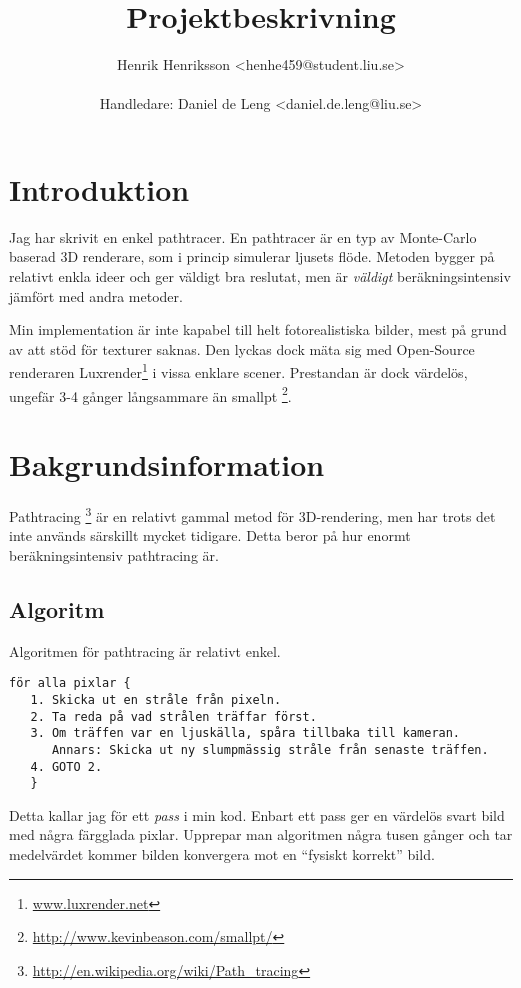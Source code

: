 \documentclass{article}
\newcommand{\subtitle}[1]{%
  \posttitle{%
    \par\end{center}
    \begin{center}\large#1\end{center}
    \vskip0.5em}%
}
\begin{document}
\title{Projektbeskrivning}
\subtitle{Pathtracer}
\author{Henrik Henriksson <henhe459@student.liu.se> \\\\
Handledare: Daniel de Leng <daniel.de.leng@liu.se>}
\maketitle
\clearpage
\tableofcontents
\clearpage

\section{Introduktion}
Jag har skrivit en enkel pathtracer. En pathtracer är en typ av
Monte-Carlo baserad 3D renderare, som i princip simulerar ljusets
flöde. Metoden bygger på relativt enkla ideer och ger väldigt bra
reslutat, men är \emph{väldigt} beräkningsintensiv jämfört med andra
metoder.

Min implementation är inte kapabel till helt fotorealistiska bilder,
mest på grund av att stöd för texturer saknas. Den lyckas dock mäta
sig med Open-Source renderaren
Luxrender\footnote{\url{www.luxrender.net}} i vissa enklare
scener. Prestandan är dock värdelös, ungefär 3-4 gånger långsammare än
smallpt
\footnote{\url{http://www.kevinbeason.com/smallpt/}}.


\section{Bakgrundsinformation}
Pathtracing
\footnote{\url{http://en.wikipedia.org/wiki/Path_tracing}}
 är en relativt gammal metod för 3D-rendering, men har
trots det inte används särskillt mycket tidigare. Detta beror på hur
enormt beräkningsintensiv pathtracing är.

\subsection{Algoritm}
Algoritmen för pathtracing är relativt enkel.
\begin{verbatim}
för alla pixlar {
   1. Skicka ut en stråle från pixeln.
   2. Ta reda på vad strålen träffar först.
   3. Om träffen var en ljuskälla, spåra tillbaka till kameran.
      Annars: Skicka ut ny slumpmässig stråle från senaste träffen.
   4. GOTO 2.
   }
\end{verbatim}
Detta kallar jag för ett \emph{pass} i min kod. Enbart ett pass ger en
värdelös svart bild med några färgglada pixlar. Upprepar man
algoritmen några tusen gånger och tar medelvärdet kommer bilden
konvergera mot en ``fysiskt korrekt'' bild.
\end{document}
